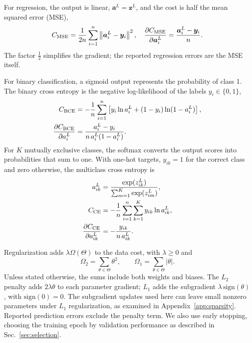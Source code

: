 \documentclass[aps,prb,reprint,superscriptaddress,nofootinbib,longbibliography,floatfix]{revtex4-2}
\begin{document}
For regression, the output is linear, $\bm a^L=\bm z^L$, and the cost is half the mean squared error (MSE),
\begin{equation}
C_{\rm MSE}=\frac{1}{2n}\sum_{i=1}^n\left\|\bm a_i^L-\bm y_i\right\|^2,
\quad
\frac{\partial C_{\rm MSE}}{\partial\bm a_i^L}
=\frac{\bm a_i^L-\bm y_i}{n}.
\label{eq:mse}
\end{equation}
The factor $\frac12$ simplifies the gradient; the reported regression errors are the MSE itself.

For binary classification, a sigmoid output represents the probability of class 1. The binary cross entropy is the negative log-likelihood of the labels $y_i\in\{0,1\}$,
\begin{align}
C_{\rm BCE}&=-\frac1n\sum_{i=1}^n\left[y_i\ln a_i^L+(1-y_i)\ln(1-a_i^L)\right],\nonumber\\
\frac{\partial C_{\rm BCE}}{\partial a_i^L}
&=\frac{a_i^L-y_i}{n\,a_i^L(1-a_i^L)}.
\label{eq:bce}
\end{align}
For $K$ mutually exclusive classes, the softmax converts the output scores into probabilities that sum to one. With one-hot targets, $y_{ik}=1$ for the correct class and zero otherwise, the multiclass cross entropy is
\begin{align}
a_{ik}^L&=\frac{\exp(z_{ik}^L)}{\sum_{m=1}^K\exp(z_{im}^L)},\nonumber\\
C_{\rm CE}&=-\frac1n\sum_{i=1}^n\sum_{k=1}^K y_{ik}\ln a_{ik}^L,\nonumber\\
\frac{\partial C_{\rm CE}}{\partial a_{ik}^L}
&=-\frac{y_{ik}}{n\,a_{ik}^L}.
\label{eq:ce}
\end{align}

Regularization adds $\lambda\Omega(\Theta)$ to the data cost, with $\lambda\ge0$ and
\begin{equation}
\Omega_2=\sum_{\theta\in\Theta}\theta^2,
\qquad
\Omega_1=\sum_{\theta\in\Theta}|\theta|.
\label{eq:penalty}
\end{equation}
Unless stated otherwise, the sums include both weights and biases. The $L_2$ penalty adds $2\lambda\theta$ to each parameter gradient; $L_1$ adds the subgradient $\lambda\,\mathrm{sign}(\theta)$, with $\mathrm{sign}(0)=0$. The subgradient updates used here can leave small nonzero parameters under $L_1$ regularization, as examined in Appendix~\ref{app:sparsity}. Reported prediction errors exclude the penalty term. We also use early stopping, choosing the training epoch by validation performance as described in Sec.~\ref{sec:selection}.
\end{document}
